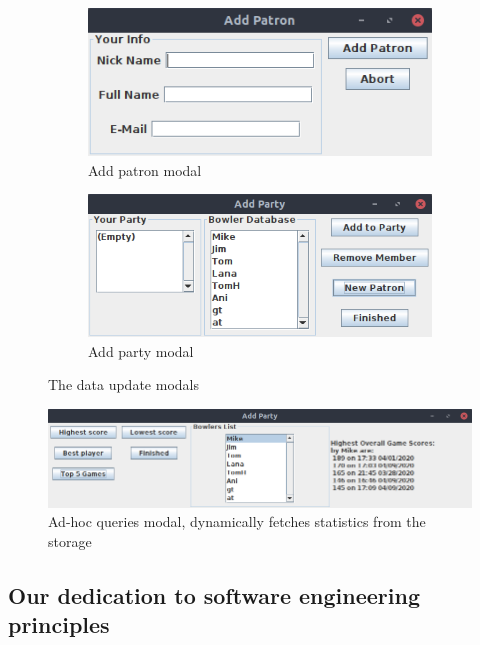 \begin{figure}[H]
    \centering
    \begin{subfigure}{\textwidth}
        \includegraphics[width = \textwidth]{img/addpatron.png}
        \caption{Add patron modal}
    \end{subfigure}
    \begin{subfigure}{\textwidth}
        \includegraphics[width = \textwidth]{img/addparty.png}
        \caption{Add party modal}
    \end{subfigure}
    \caption{The data update modals}
\end{figure}

\begin{figure}[H]
    \centering
    \includegraphics[width = \textwidth]{img/queries.png}
    \caption{Ad-hoc queries modal, dynamically fetches statistics from the storage}
\end{figure}

\subsection{Our dedication to software engineering principles}

